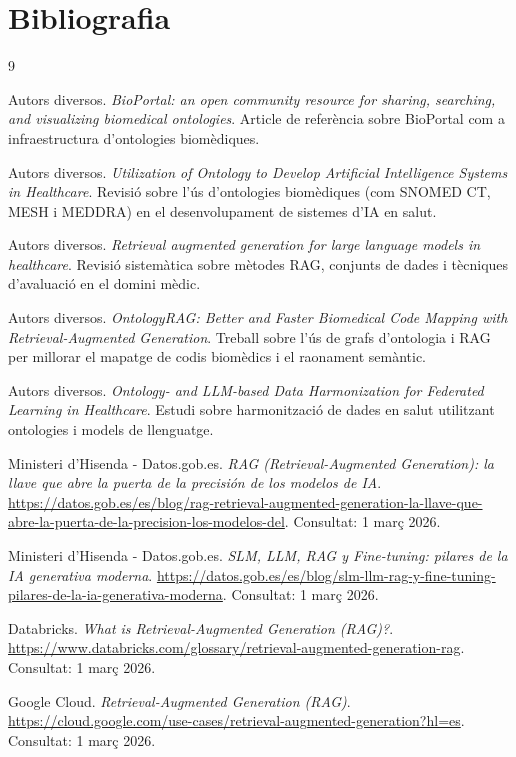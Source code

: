 \documentclass[11pt,a4paper]{article}
\begin{document}
\section*{Bibliografia}
\begin{thebibliography}{9}

Autors diversos.
\newblock \emph{BioPortal: an open community resource for sharing, searching, and visualizing biomedical ontologies}.
\newblock Article de referència sobre BioPortal com a infraestructura d'ontologies biomèdiques.

Autors diversos.
\newblock \emph{Utilization of Ontology to Develop Artificial Intelligence Systems in Healthcare}.
\newblock Revisió sobre l'ús d'ontologies biomèdiques (com SNOMED CT, MESH i MEDDRA) en el desenvolupament de sistemes d'IA en salut.

Autors diversos.
\newblock \emph{Retrieval augmented generation for large language models in healthcare}.
\newblock Revisió sistemàtica sobre mètodes RAG, conjunts de dades i tècniques d'avaluació en el domini mèdic.

Autors diversos.
\newblock \emph{OntologyRAG: Better and Faster Biomedical Code Mapping with Retrieval-Augmented Generation}.
\newblock Treball sobre l'ús de grafs d'ontologia i RAG per millorar el mapatge de codis biomèdics i el raonament semàntic.

Autors diversos.
\newblock \emph{Ontology- and LLM-based Data Harmonization for Federated Learning in Healthcare}.
\newblock Estudi sobre harmonització de dades en salut utilitzant ontologies i models de llenguatge.

Ministeri d'Hisenda - Datos.gob.es.
\newblock \emph{RAG (Retrieval-Augmented Generation): la llave que abre la puerta de la precisión de los modelos de IA}.
\newblock \url{https://datos.gob.es/es/blog/rag-retrieval-augmented-generation-la-llave-que-abre-la-puerta-de-la-precision-los-modelos-del}. Consultat: 1 març 2026.

Ministeri d'Hisenda - Datos.gob.es.
\newblock \emph{SLM, LLM, RAG y Fine-tuning: pilares de la IA generativa moderna}.
\newblock \url{https://datos.gob.es/es/blog/slm-llm-rag-y-fine-tuning-pilares-de-la-ia-generativa-moderna}. Consultat: 1 març 2026.

Databricks.
\newblock \emph{What is Retrieval-Augmented Generation (RAG)?}.
\newblock \url{https://www.databricks.com/glossary/retrieval-augmented-generation-rag}. Consultat: 1 març 2026.

Google Cloud.
\newblock \emph{Retrieval-Augmented Generation (RAG)}.
\newblock \url{https://cloud.google.com/use-cases/retrieval-augmented-generation?hl=es}. Consultat: 1 març 2026.

\end{thebibliography}
\end{document}
